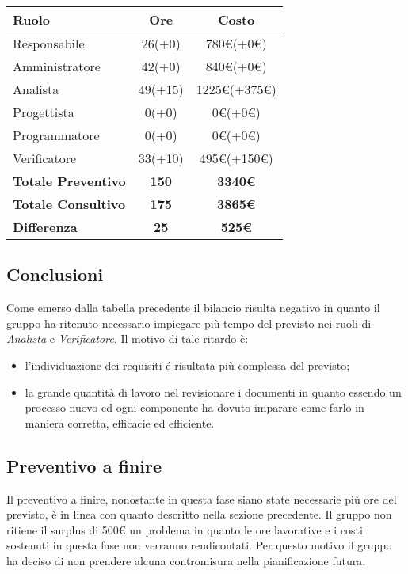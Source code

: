 {
	\begin{center}
		\renewcommand{\arraystretch}{1.4}
		\begin{tabularx}{10cm}{|X|c|c|}
			\hline
			\rowcolor{airforceblue}
			\textbf{Ruolo} & \textbf{Ore} & \textbf{Costo}\\
			\hline
			Responsabile & 26(+0) & 780\euro(+0\euro)\\
			\hline
			Amministratore & 42(+0) & 840\euro(+0\euro)\\
			\hline
			Analista & 49(+15) & 1225\euro(+375\euro)\\
			\hline
			Progettista & 0(+0) & 0\euro(+0\euro)\\
			\hline
			Programmatore & 0(+0) & 0\euro(+0\euro)\\
			\hline
			Verificatore & 33(+10) & 495\euro(+150\euro)\\
			\hline
			\textbf{Totale Preventivo} & \textbf{150} & \textbf{3340\euro}\\
			\hline
			\textbf{Totale Consultivo} & \textbf{175} & \textbf{3865\euro}\\
			\hline
			\textbf{Differenza} & \textbf{25} & \textbf{525\euro}
		\end{tabularx}
	\end{center}

\subsection{Conclusioni}\label{ConsuntivoPeriodoDiAnalisiConclusioni}
Come emerso dalla tabella precedente il bilancio risulta negativo in quanto il gruppo ha ritenuto necessario impiegare più tempo del previsto nei ruoli di \textit{Analista} e \textit{Verificatore}. Il motivo di tale ritardo è:
\begin{itemize}
	\item l'individuazione dei requisiti é risultata più complessa del previsto;
	\item la grande quantità di lavoro nel revisionare i documenti in quanto essendo un processo nuovo ed ogni componente ha dovuto imparare come farlo in maniera corretta, efficacie ed efficiente.
\end{itemize}

\subsection{Preventivo a finire}\label{ConsuntivoPeriodoDiAnalisiPreventivoAFinire}
Il preventivo a finire, nonostante in questa fase siano state necessarie più ore del previsto, è in linea con quanto descritto nella sezione precedente. Il gruppo non ritiene il surplus di 500\euro{} un problema in quanto le ore lavorative e i costi sostenuti in questa fase non verranno rendicontati. Per questo motivo il gruppo ha deciso di non prendere alcuna contromisura nella pianificazione futura.

}
